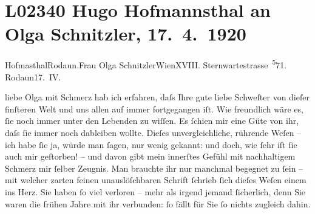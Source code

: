 

\section[Hugo Hofmannsthal an Olga Schnitzler, 17. 4. 1920]{L02340 Hugo Hofmannsthal an Olga Schnitzler, 17. 4. 1920}
\nopagebreak{}
\rehead{ }\normalsize\beginnumbering{}
\toendnotes[C]{\smallbreak\pagebreak[2]}
\toendnotes[C]{\smallbreak}\pstart{}{\pb}Hofma{\geminationn}sthal\pend{}\pstart{}Rodaun.\pend{}{\bigskip}\pstart{}Frau Olga Schnitzler\pend{}\pstart{}Wien\pend{}\pstart{}XVIII. Sternwartestrasse \substVorne{}\textsuperscript{5}\substDazwischen{}7\substHinten{}1.\pend{}{\bigskip}\vspace{1em}
\pstart
           \raggedleft{}{\pb}Rodaun17. IV.\pend
           
\pstart{}liebe Olga\pend\vspace{0.5em}
\pstart
           mit Schmerz hab ich erfahren, daſs Ihre gute liebe Schweſter von dieſer finſteren Welt und uns allen auf immer
               fortgegangen iſt. Wie freundlich wäre es, ſie noch immer unter den Lebenden zu
               wiſſen. Es ſchien mir eine Güte von ihr, daſs ſie immer noch dableiben wollte. Dieſes
               unvergleichliche, rührende Weſen – ich habe ſie ja, {\pb}würde man ſagen,
               nur wenig gekannt: und doch, wie ſehr iſt ſie auch mir geſtorben! – und davon gibt
               mein innerſtes Gefühl mit nachhaltigem Schmerz mir ſelber Zeugnis. Man brauchte ihr
               nur manchmal begegnet zu ſein – mit welcher zarten feinen unauslöſchbaren Schrift
               ſchrieb ſich dieſes Weſen
               einem ins Herz. Sie haben ſo viel {\pb}verloren – mehr als
               irgend jemand ſicherlich, denn Sie waren die frühen Jahre mit ihr verbunden: ſo fällt
               für Sie ſo nichts zugleich dahin.\pend
           

